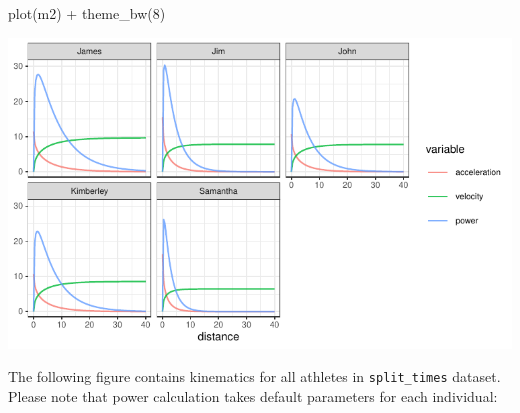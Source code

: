 \documentclass[fleqn,10pt,lineno]{wlpeerj} %
\newenvironment{Shaded}{\begin{snugshade}}{\end{snugshade}}
\newcommand{\DecValTok}[1]{\textcolor[rgb]{0.00,0.00,0.81}{#1}}
\newcommand{\FunctionTok}[1]{\textcolor[rgb]{0.00,0.00,0.00}{#1}}
\newcommand{\NormalTok}[1]{#1}
\newcommand{\SpecialCharTok}[1]{\textcolor[rgb]{0.00,0.00,0.00}{#1}}
\begin{document}
\begin{Shaded}
\begin{Highlighting}[]
\FunctionTok{plot}\NormalTok{(m2) }\SpecialCharTok{+} \FunctionTok{theme\_bw}\NormalTok{(}\DecValTok{8}\NormalTok{)}
\end{Highlighting}
\end{Shaded}

\begin{center}\includegraphics[width=0.9\linewidth]{paper_files/figure-latex/unnamed-chunk-11-1} \end{center}

The following figure contains kinematics for all athletes in \texttt{split\_times} dataset. Please note that power calculation takes default parameters for each individual:
\end{document}
